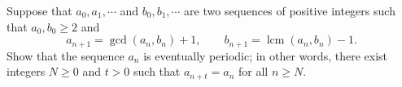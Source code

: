 Suppose that 
$a_0, a_1, \cdots $
 and 
$b_0, b_1, \cdots$
 are two sequences of positive integers such that 
$a_0, b_0 \ge 2$
 and 
\[ a_{n+1} = \gcd{(a_n, b_n)} + 1, \qquad b_{n+1} = \operatorname{lcm}{(a_n, b_n)} - 1. \]
Show that the sequence 
$a_n$
 is eventually periodic; in other words, there exist integers 
$N \ge 0$
 and 
$t > 0$
 such that 
$a_{n+t} = a_n$
 for all 
$n \ge N$.
